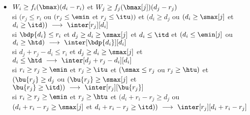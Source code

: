 \documentclass{report}
\begin{document}
\begin{itemize}
\item $W_i\ge f_i(\bmax)(d_i-r_i)$ et $W_j \ge f_j(\bmax[j])(d_j-r_j)$\\
\vspace{0.2cm}
si $(r_j \le r_i$ ou $(r_j \le \emin$ et $r_j \le \itu))$ et 
$(d_i \ge d_j$ ou $(d_i \ge \smax[j]$ et $d_i \ge \itd))\ 
\longrightarrow\ \inter[r_j][d_i]$\\
\vspace{0.1cm}
si $\bdp{d_i} \le r_i$ et $d_j \ge d_i \ge \smax[j]$ et $d_i \le \itd$ et
  $(d_i \le \emin[j]$ ou $d_i \ge \htd)\ \longrightarrow\ 
\inter[\bdp{d_i}][d_i]$\\
\vspace{0.1cm}
si $d_j+r_j-d_i \le r_i$ et $d_j \ge d_i \ge \smax[j]$ et 
$d_i\le \htd\ \longrightarrow\ \inter[d_j+r_j-d_i][d_i]$\\
\vspace{0.1cm}
si $r_i \ge r_j \ge \emin$ et $r_j \ge \itu$ et 
$(\smax \le r_j$ ou $ r_j \ge \htu)$ et   
$(\bu{r_j} \ge d_j$ ou $(\bu{r_j} \ge \smax[j]$ et    
$\bu{r_j} \ge \itd))\ \longrightarrow\ \inter[r_j][\bu{r_j}]$\\
\vspace{0.1cm}
si $r_i \ge r_j \ge \emin$ et $r_j \ge \htu$ et 
$(d_i+r_i-r_j \ge d_j$ ou $(d_i+r_i-r_j \ge \smax[j]$ et   
$d_i+r_i-r_j \ge \itd))\ \longrightarrow\ \inter[r_j][d_i+r_i-r_j]$\\



\end{itemize}
\end{document}
